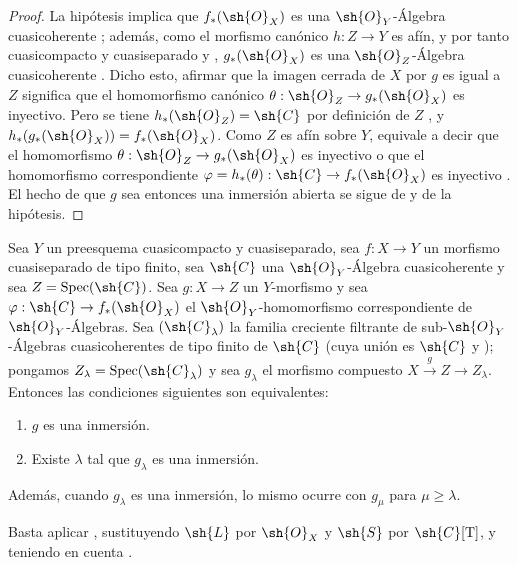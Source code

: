 \begin{proof}
La hipótesis implica que $f_*(\sh{O}_X)$ es una $\sh{O}_Y$-Álgebra cuasicoherente ; además, como el morfismo canónico $h:Z\to Y$ es afín, y por tanto cuasicompacto y cuasiseparado  y , $g_*(\sh{O}_X)$ es una $\sh{O}_Z$-Álgebra cuasicoherente .
Dicho esto, afirmar que la imagen cerrada de $X$ por $g$ es igual a $Z$ significa  que el homomorfismo canónico $\theta:\sh{O}_Z\to g_*(\sh{O}_X)$ es inyectivo.
Pero se tiene $h_*(\sh{O}_Z)=\sh{C}$ por definición de $Z$ , y $h_*(g_*(\sh{O}_X))=f_*(\sh{O}_X)$.
Como $Z$ es afín sobre $Y$, equivale a decir que el homomorfismo $\theta:\sh{O}_Z\to g_*(\sh{O}_X)$ es inyectivo o que el homomorfismo correspondiente $\varphi=h_*(\theta):\sh{C}\to f_*(\sh{O}_X)$ es inyectivo .
El hecho de que $g$ sea entonces una inmersión abierta se sigue de  y de la hipótesis.
\end{proof}

\begin{lemma}[8.12.2]
\label{IV.8.12.2}
Sea $Y$ un preesquema cuasicompacto y cuasiseparado, sea $f:X\to Y$ un morfismo cuasiseparado de tipo finito, sea $\sh{C}$ una $\sh{O}_Y$-Álgebra cuasicoherente y sea $Z=\operatorname{Spec}(\sh{C})$.
Sea $g:X\to Z$ un $Y$-morfismo y sea $\varphi:\sh{C}\to f_*(\sh{O}_X)$ el $\sh{O}_Y$-homomorfismo correspondiente de $\sh{O}_Y$-Álgebras.
Sea $(\sh{C}_\lambda)$ la familia creciente filtrante de sub-$\sh{O}_Y$-Álgebras cuasicoherentes de tipo finito de $\sh{C}$ (cuya unión es $\sh{C}$  y ); pongamos $Z_\lambda=\operatorname{Spec}(\sh{C}_\lambda)$ y sea $g_\lambda$ el morfismo compuesto $X\xrightarrow{g}Z\to Z_\lambda$.
Entonces las condiciones siguientes son equivalentes:
\begin{enumerate}[label=\emph{\alph*)}]
  \item $g$ es una inmersión.
  \item Existe $\lambda$ tal que $g_\lambda$ es una inmersión.
\end{enumerate}
Además, cuando $g_\lambda$ es una inmersión, lo mismo ocurre con $g_\mu$ para $\mu\geqslant\lambda$.

Basta aplicar , sustituyendo $\sh{L}$ por $\sh{O}_X$ y $\sh{S}$ por $\sh{C}[\mathrm{T}]$, y teniendo en cuenta .
\end{lemma}

